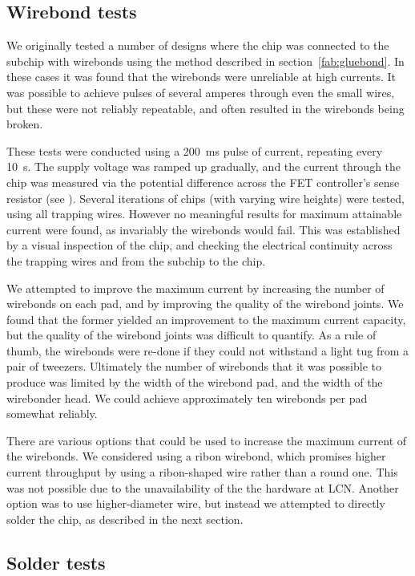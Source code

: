 \subsection{Wirebond tests}

We originally tested a number of designs where the chip was connected to the
subchip with wirebonds using the method described in
section~\ref{fab:gluebond}. In these cases it was found that the wirebonds were
unreliable at high currents. It was possible to achieve pulses of several
amperes through even the small wires, but these were not reliably repeatable,
and often resulted in the wirebonds being broken.

These tests were conducted using a \SI{200}{\milli\second} pulse of current,
repeating every \SI{10}{\second}. The supply voltage was ramped up gradually,
and the current through the chip was measured via the potential difference
across the FET controller's sense resistor (see ).
Several iterations of chips (with varying wire heights) were tested, using all
trapping wires. However no meaningful results for maximum attainable current
were found, as invariably the wirebonds would fail. This was established by a
visual inspection of the chip, and checking the electrical continuity across
the trapping wires and from the subchip to the chip.

We attempted to improve the maximum current by increasing the number of
wirebonds on each pad, and by improving the quality of the wirebond joints. We
found that the former yielded an improvement to the maximum current capacity,
but the quality of the wirebond joints was difficult to quantify. As a rule of
thumb, the wirebonds were re-done if they could not withstand a light tug from
a pair of tweezers. Ultimately the number of wirebonds that it was possible to
produce was limited by the width of the wirebond pad, and the width of the
wirebonder head. We could achieve approximately ten wirebonds per pad somewhat
reliably.

There are various options that could be used to increase the maximum current of
the wirebonds.  We considered using a ribon wirebond, which promises
higher current throughput by using a ribon-shaped wire rather than a round one.
This was not possible due to the unavailability of the the hardware at LCN.
Another option was to use higher-diameter wire, but instead we attempted to
directly solder the chip, as described in the next section.

\subsection{Solder tests}

